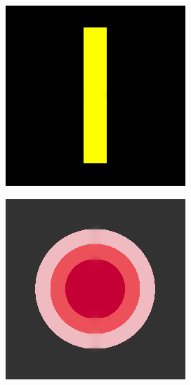 \begin{figure}[H]
	\centering
	\begin{subfigure}{0.4\linewidth}
		\centering
		\includegraphics[width=0.8\linewidth]{image/result_ex1/fixpoint01.png}
	\end{subfigure}
	\begin{subfigure}{0.4\linewidth}
		\centering
		\includegraphics[width=0.8\linewidth]{image/result_ex1/fixpoint02.png}
	\end{subfigure}
	\begin{subfigure}{0.4\linewidth}
		\centering

\end{subfigure}
\end{figure}
